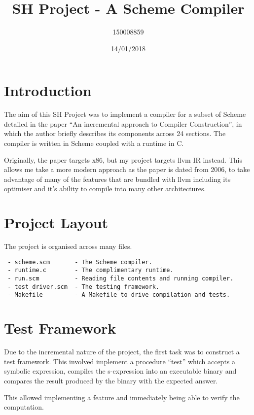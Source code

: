 \documentclass{article}
\title{SH Project - A Scheme Compiler}
\date{14/01/2018}
\author{150008859}
\begin{document}
\maketitle
\newpage

\section{Introduction}

The aim of this SH Project was to implement a compiler for a subset of Scheme detailed in the paper ``An incremental approach to Compiler Construction'', in which the author briefly describes its components across 24 sections. The compiler is written in Scheme coupled with a runtime in C.

Originally, the paper targets x86, but my project targets llvm IR instead. This allows me take a more modern approach as the paper is dated from 2006, to take advantage of many of the features that are bundled with llvm including its optimiser and it's ability to compile into many other architectures. 

\section{Project Layout}

The project is organised across many files.

\begin{verbatim}
 - scheme.scm       - The Scheme compiler.
 - runtime.c        - The complimentary runtime.
 - run.scm          - Reading file contents and running compiler.
 - test_driver.scm  - The testing framework.
 - Makefile         - A Makefile to drive compilation and tests. 
\end{verbatim}



\section{Test Framework}

Due to the incremental nature of the project, the first task was to construct a test framework. This involved implement a procedure ``test'' which accepts a symbolic expression, compiles the s-expression into an executable binary and compares the result produced by the binary with the expected answer.

This allowed implementing a feature and immediately being able to verify the computation.
\end{document}
